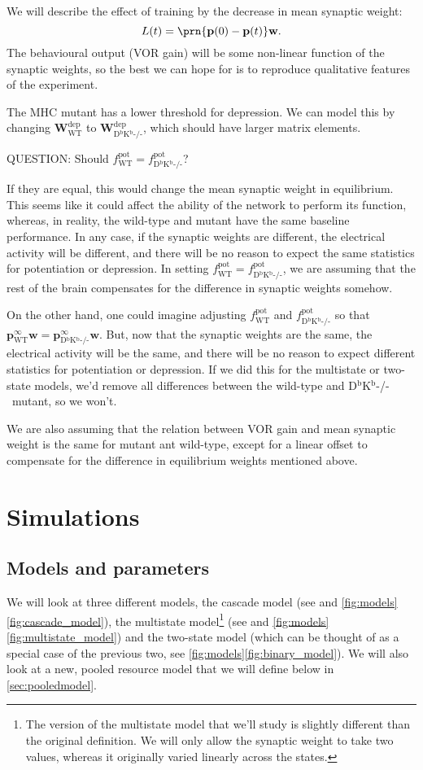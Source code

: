 \documentclass[12pt]{article}
\newcommand{\pr}{\mathbf{p}}
\newcommand{\eq}{\pr^\infty}
\newcommand{\w}{\mathbf{w}}
\newcommand{\W}{\mathbf{W}}
\newcommand{\pot}{^{\text{pot}}}
\newcommand{\dep}{^{\text{dep}}}
\newcommand{\wt}{_{\text{WT}}}
\newcommand{\ko}{_{\text{D$^\mathrm{b}$K$^\mathrm{b}$-/-}}}
\newcommand{\KO}{D$^\mathrm{b}$K$^\mathrm{b}$-/-}
\begin{document}
We will describe the effect of training by the decrease in mean synaptic weight:
%
\begin{equation}\label{eq:learning}
  L(t) = \prn{\pr(0)-\pr(t)}\w.
\end{equation}
%
The behavioural output (VOR gain) will be some non-linear function of the synaptic weights, so the best we can hope for is to reproduce qualitative features of the experiment.

The MHC mutant has a lower threshold for depression.
We can model this by changing $\W\dep\wt$ to $\W\dep\ko$, which should have larger matrix elements.

QUESTION: Should $f\pot\wt=f\pot\ko$?

If they are equal, this would change the mean synaptic weight in equilibrium.
This seems like it could affect the ability of the network to perform its function, whereas, in reality, the wild-type and mutant have the same baseline performance.
In any case, if the synaptic weights are different, the electrical activity will be different, and there will be no reason to expect the same statistics for potentiation or depression.
In setting $f\pot\wt=f\pot\ko$, we are assuming that the rest of the brain compensates for the difference in synaptic weights somehow.

On the other hand, one could imagine adjusting $f\pot\wt$ and $f\pot\ko$ so that $\eq\wt\w = \eq\ko\w$.
But, now that the synaptic weights are the same, the electrical activity will be the same, and there will be no reason to expect different statistics for potentiation or depression.
If we did this for the multistate or two-state models, we'd remove all differences between the wild-type and \KO\ mutant, so we won't.

We are also assuming that the relation between VOR gain and mean synaptic weight is the same for mutant ant wild-type, except for a linear offset to compensate for the difference in equilibrium weights mentioned above.


\section{Simulations}\label{sec:sims}

\subsection{Models and parameters}

We will look at three different models, the cascade model (see \cite{Fusi2005cascade} and \autoref{fig:models}\ref{fig:cascade_model}), the multistate model\footnote{The version of the multistate model that we'll study is slightly different than the original definition. We will only allow the synaptic weight to take two values, whereas it originally varied linearly across the states. } (see \cite{amit1994learning,Fusi2007multistate} and \autoref{fig:models}\ref{fig:multistate_model}) and the two-state model (which can be thought of as a special case of the previous two, see \autoref{fig:models}\ref{fig:binary_model}).
We will also look at a new, pooled resource model that we will define below in \autoref{sec:pooledmodel}.
\end{document}
